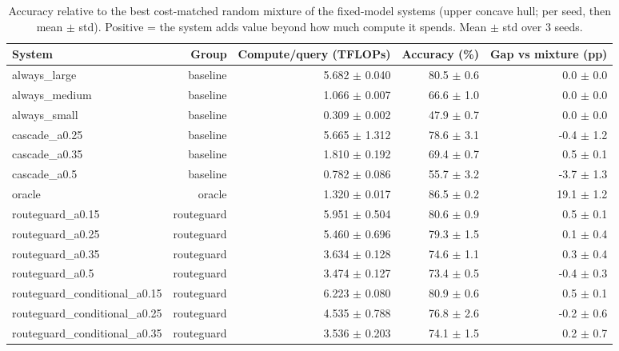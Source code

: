 \begin{table}[t]
\centering
\small
\caption{Accuracy relative to the best cost-matched random mixture of the fixed-model systems (upper concave hull; per seed, then mean $\pm$ std). Positive = the system adds value beyond how much compute it spends. Mean $\pm$ std over 3 seeds.}
\label{tab:cost_matched_mixture}
\begin{tabular}{lrrrr}
\toprule
System & Group & Compute/query (TFLOPs) & Accuracy (\%) & Gap vs mixture (pp) \\
\midrule
always\_large & baseline & 5.682 $\pm$ 0.040 & 80.5 $\pm$ 0.6 & 0.0 $\pm$ 0.0 \\
always\_medium & baseline & 1.066 $\pm$ 0.007 & 66.6 $\pm$ 1.0 & 0.0 $\pm$ 0.0 \\
always\_small & baseline & 0.309 $\pm$ 0.002 & 47.9 $\pm$ 0.7 & 0.0 $\pm$ 0.0 \\
cascade\_a0.25 & baseline & 5.665 $\pm$ 1.312 & 78.6 $\pm$ 3.1 & -0.4 $\pm$ 1.2 \\
cascade\_a0.35 & baseline & 1.810 $\pm$ 0.192 & 69.4 $\pm$ 0.7 & 0.5 $\pm$ 0.1 \\
cascade\_a0.5 & baseline & 0.782 $\pm$ 0.086 & 55.7 $\pm$ 3.2 & -3.7 $\pm$ 1.3 \\
oracle & oracle & 1.320 $\pm$ 0.017 & 86.5 $\pm$ 0.2 & 19.1 $\pm$ 1.2 \\
routeguard\_a0.15 & routeguard & 5.951 $\pm$ 0.504 & 80.6 $\pm$ 0.9 & 0.5 $\pm$ 0.1 \\
routeguard\_a0.25 & routeguard & 5.460 $\pm$ 0.696 & 79.3 $\pm$ 1.5 & 0.1 $\pm$ 0.4 \\
routeguard\_a0.35 & routeguard & 3.634 $\pm$ 0.128 & 74.6 $\pm$ 1.1 & 0.3 $\pm$ 0.4 \\
routeguard\_a0.5 & routeguard & 3.474 $\pm$ 0.127 & 73.4 $\pm$ 0.5 & -0.4 $\pm$ 0.3 \\
routeguard\_conditional\_a0.15 & routeguard & 6.223 $\pm$ 0.080 & 80.9 $\pm$ 0.6 & 0.5 $\pm$ 0.1 \\
routeguard\_conditional\_a0.25 & routeguard & 4.535 $\pm$ 0.788 & 76.8 $\pm$ 2.6 & -0.2 $\pm$ 0.6 \\
routeguard\_conditional\_a0.35 & routeguard & 3.536 $\pm$ 0.203 & 74.1 $\pm$ 1.5 & 0.2 $\pm$ 0.7 \\
\bottomrule
\end{tabular}
\end{table}
